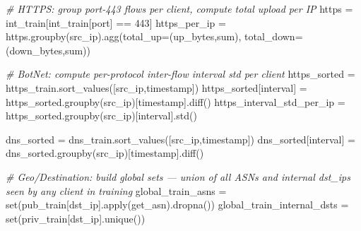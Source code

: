 \documentclass[
  11pt,
]{article}
\newenvironment{Shaded}{\vspace{4pt}}{\vspace{4pt}}
\newcommand{\BuiltInTok}[1]{\textcolor[rgb]{0.00,0.50,0.00}{#1}}
\newcommand{\CommentTok}[1]{\textcolor[rgb]{0.38,0.63,0.69}{\textit{#1}}}
\newcommand{\DecValTok}[1]{\textcolor[rgb]{0.25,0.63,0.44}{#1}}
\newcommand{\NormalTok}[1]{#1}
\newcommand{\OperatorTok}[1]{\textcolor[rgb]{0.40,0.40,0.40}{#1}}
\newcommand{\StringTok}[1]{\textcolor[rgb]{0.25,0.44,0.63}{#1}}
\begin{document}
\begin{Shaded}
\begin{Highlighting}[]
\CommentTok{\# HTTPS: group port{-}443 flows per client, compute total upload per IP}
\NormalTok{  https }\OperatorTok{=}\NormalTok{ int\_train[int\_train[}\StringTok{\textquotesingle{}port\textquotesingle{}}\NormalTok{] }\OperatorTok{==} \DecValTok{443}\NormalTok{]}
\NormalTok{  https\_per\_ip }\OperatorTok{=}\NormalTok{ https.groupby(}\StringTok{\textquotesingle{}src\_ip\textquotesingle{}}\NormalTok{).agg(total\_up}\OperatorTok{=}\NormalTok{(}\StringTok{\textquotesingle{}up\_bytes\textquotesingle{}}\NormalTok{,}\StringTok{\textquotesingle{}sum\textquotesingle{}}\NormalTok{), total\_down}\OperatorTok{=}\NormalTok{(}\StringTok{\textquotesingle{}down\_bytes\textquotesingle{}}\NormalTok{,}\StringTok{\textquotesingle{}sum\textquotesingle{}}\NormalTok{))}

\CommentTok{\# BotNet: compute per{-}protocol inter{-}flow interval std per client}
\NormalTok{  https\_sorted }\OperatorTok{=}\NormalTok{ https\_train.sort\_values([}\StringTok{\textquotesingle{}src\_ip\textquotesingle{}}\NormalTok{,}\StringTok{\textquotesingle{}timestamp\textquotesingle{}}\NormalTok{])}
\NormalTok{  https\_sorted[}\StringTok{\textquotesingle{}interval\textquotesingle{}}\NormalTok{] }\OperatorTok{=}\NormalTok{ https\_sorted.groupby(}\StringTok{\textquotesingle{}src\_ip\textquotesingle{}}\NormalTok{)[}\StringTok{\textquotesingle{}timestamp\textquotesingle{}}\NormalTok{].diff()}
\NormalTok{  https\_interval\_std\_per\_ip }\OperatorTok{=}\NormalTok{ https\_sorted.groupby(}\StringTok{\textquotesingle{}src\_ip\textquotesingle{}}\NormalTok{)[}\StringTok{\textquotesingle{}interval\textquotesingle{}}\NormalTok{].std()}

\NormalTok{  dns\_sorted }\OperatorTok{=}\NormalTok{ dns\_train.sort\_values([}\StringTok{\textquotesingle{}src\_ip\textquotesingle{}}\NormalTok{,}\StringTok{\textquotesingle{}timestamp\textquotesingle{}}\NormalTok{])}
\NormalTok{  dns\_sorted[}\StringTok{\textquotesingle{}interval\textquotesingle{}}\NormalTok{] }\OperatorTok{=}\NormalTok{ dns\_sorted.groupby(}\StringTok{\textquotesingle{}src\_ip\textquotesingle{}}\NormalTok{)[}\StringTok{\textquotesingle{}timestamp\textquotesingle{}}\NormalTok{].diff()}

\CommentTok{\# Geo/Destination: build global sets — union of all ASNs and internal dst\_ips seen by any client in training}
\NormalTok{  global\_train\_asns }\OperatorTok{=} \BuiltInTok{set}\NormalTok{(pub\_train[}\StringTok{\textquotesingle{}dst\_ip\textquotesingle{}}\NormalTok{].}\BuiltInTok{apply}\NormalTok{(get\_asn).dropna())}
\NormalTok{  global\_train\_internal\_dsts }\OperatorTok{=} \BuiltInTok{set}\NormalTok{(priv\_train[}\StringTok{\textquotesingle{}dst\_ip\textquotesingle{}}\NormalTok{].unique())}


\end{Highlighting}
\end{Shaded}
\end{document}
